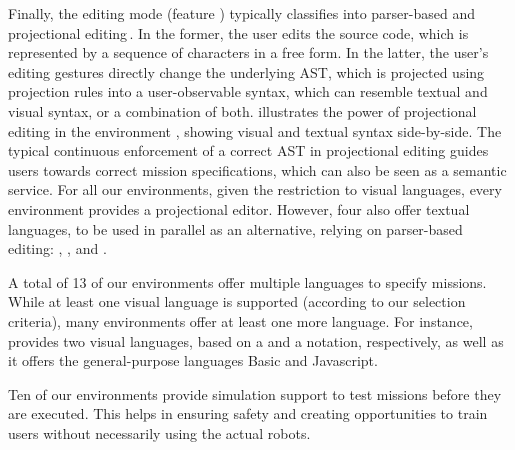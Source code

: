 Finally, the editing mode (feature \feditingmode) typically classifies into parser-based and projectional editing\,\cite{voelter2014projectional,berger2016pe}. In the former, the user edits the source code, which is represented by a sequence of characters in a free form. In the latter, the user's editing gestures directly change the underlying AST, which is projected using projection rules into a user-observable syntax, which can resemble textual and visual syntax, or a combination of both.  illustrates the power of projectional editing in the environment \easyc, showing visual and textual syntax side-by-side. The typical continuous enforcement of a correct AST in projectional editing guides users towards correct mission specifications, which can also be seen as a semantic service. For all our environments, given the restriction to visual languages, every environment provides a projectional editor. However, four also offer textual languages, to be used in parallel as an alternative, relying on parser-based editing: \aseba, \vex, \turtlebot and \robotc.

 A total of 13 of our environments offer multiple languages to specify missions. While at least one visual language is supported (according to our selection criteria), many environments offer at least one more language. For instance, \picaxe provides two visual languages, based on a \fflowchart and a \fblockly notation, respectively, as well as it offers the general-purpose languages Basic and Javascript.



 Ten of our environments provide simulation support to test missions before they are executed. This helps in ensuring safety and creating opportunities to train users without necessarily using the actual robots.

